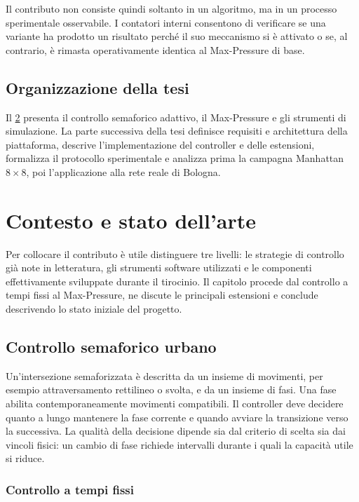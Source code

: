 \documentclass[12pt,a4paper,oneside]{report}
\numberwithin{equation}{chapter}
\begin{document}
Il contributo non consiste quindi soltanto in un algoritmo, ma in un processo
sperimentale osservabile. I contatori interni consentono di verificare se una
variante ha prodotto un risultato perché il suo meccanismo si è attivato o se,
al contrario, è rimasta operativamente identica al Max-Pressure di base.

\section{Organizzazione della tesi}

Il \cref{chap:stato-arte} presenta il controllo semaforico adattivo, il
Max-Pressure e gli strumenti di simulazione. La parte successiva della tesi
definisce requisiti e architettura della piattaforma, descrive
l'implementazione del controller e delle estensioni, formalizza il protocollo
sperimentale e analizza prima la campagna Manhattan $8\times8$, poi
l'applicazione alla rete reale di Bologna.


\chapter{Contesto e stato dell'arte}
\label{chap:stato-arte}

Per collocare il contributo è utile distinguere tre livelli:
le strategie di controllo già note in letteratura, gli strumenti software
utilizzati e le componenti effettivamente sviluppate durante il tirocinio. Il
capitolo procede dal controllo a tempi fissi al Max-Pressure, ne discute le
principali estensioni e conclude descrivendo lo stato iniziale del progetto.

\section{Controllo semaforico urbano}

Un'intersezione semaforizzata è descritta da un insieme di movimenti, per
esempio attraversamento rettilineo o svolta, e da un insieme di fasi. Una fase
abilita contemporaneamente movimenti compatibili. Il controller deve decidere
quanto a lungo mantenere la fase corrente e quando avviare la transizione verso
la successiva. La qualità della decisione dipende sia dal criterio di scelta
sia dai vincoli fisici: un cambio di fase richiede intervalli durante i quali
la capacità utile si riduce.

\subsection{Controllo a tempi fissi}
\end{document}

